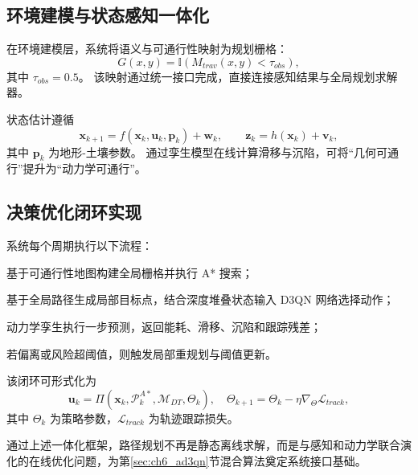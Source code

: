\subsection{环境建模与状态感知一体化}
\label{subsec:ch6_env_state}

在环境建模层，系统将语义与可通行性映射为规划栅格：
\begin{equation}
G(x,y)=\mathbb{I}\!\left(M_{trav}(x,y)<\tau_{obs}\right),
\label{eq:ch6_grid_from_trav}
\end{equation}
其中 $\tau_{obs}=0.5$。
该映射通过统一接口完成，直接连接感知结果与全局规划求解器。

状态估计遵循
\begin{equation}
\mathbf{x}_{k+1}=f(\mathbf{x}_k,\mathbf{u}_k,\mathbf{p}_k)+\mathbf{w}_k,\qquad
\mathbf{z}_k=h(\mathbf{x}_k)+\mathbf{v}_k,
\label{eq:ch6_state_observe}
\end{equation}
其中 $\mathbf{p}_k$ 为地形-土壤参数。
通过孪生模型在线计算滑移与沉陷，可将“几何可通行”提升为“动力学可通行”。

\subsection{决策优化闭环实现}
\label{subsec:ch6_decision_loop}

系统每个周期执行以下流程：
\begin{myitemize}
	\item 基于可通行性地图构建全局栅格并执行 A* 搜索；
	\item 基于全局路径生成局部目标点，结合深度堆叠状态输入 D3QN 网络选择动作；
	\item 动力学孪生执行一步预测，返回能耗、滑移、沉陷和跟踪残差；
	\item 若偏离或风险超阈值，则触发局部重规划与阈值更新。
\end{myitemize}

该闭环可形式化为
\begin{equation}
\mathbf{u}_k=\Pi\!\left(\mathbf{x}_k,\mathcal{P}^{A*}_k,\mathcal{M}_{DT},\Theta_k\right),\quad
\Theta_{k+1}=\Theta_k-\eta\nabla_{\Theta}\mathcal{L}_{track},
\label{eq:ch6_closed_loop}
\end{equation}
其中 $\Theta_k$ 为策略参数，$\mathcal{L}_{track}$ 为轨迹跟踪损失。

通过上述一体化框架，路径规划不再是静态离线求解，而是与感知和动力学联合演化的在线优化问题，为第\ref{sec:ch6_ad3qn}节混合算法奠定系统接口基础。
